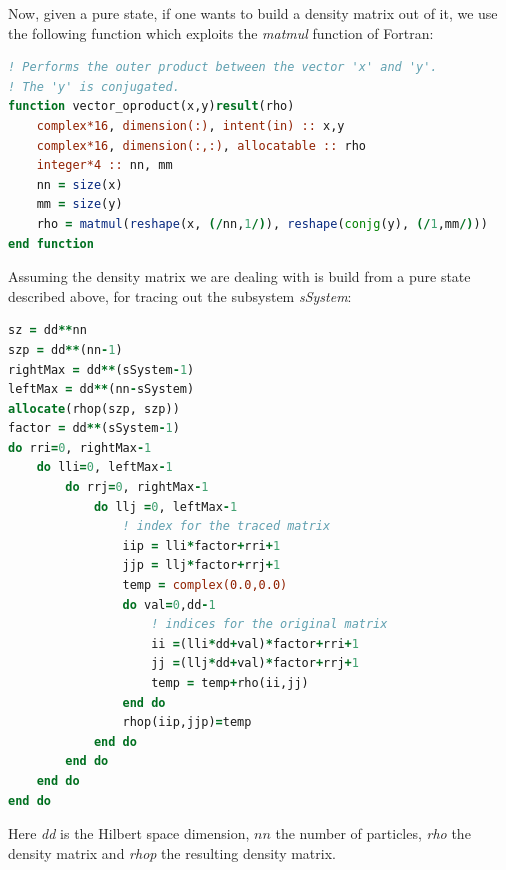 \documentclass{article}
\begin{document}
Now, given a pure state, if one wants to build a density matrix out of it, we use the following function which exploits the \textit{matmul} function of Fortran:
\begin{small}
\begin{lstlisting}[language=Fortran]
! Performs the outer product between the vector 'x' and 'y'.
! The 'y' is conjugated.
function vector_oproduct(x,y)result(rho)
	complex*16, dimension(:), intent(in) :: x,y
	complex*16, dimension(:,:), allocatable :: rho
	integer*4 :: nn, mm
	nn = size(x)
	mm = size(y)
	rho = matmul(reshape(x, (/nn,1/)), reshape(conjg(y), (/1,mm/)))
end function
\end{lstlisting}
\end{small}
Assuming the density matrix we are dealing with is build from a pure state described above, for tracing out the subsystem \textit{sSystem}:
\begin{small}
\begin{lstlisting}[language=Fortran]
sz = dd**nn
szp = dd**(nn-1)
rightMax = dd**(sSystem-1)
leftMax = dd**(nn-sSystem)
allocate(rhop(szp, szp))
factor = dd**(sSystem-1)
do rri=0, rightMax-1
	do lli=0, leftMax-1
		do rrj=0, rightMax-1
			do llj =0, leftMax-1
				! index for the traced matrix
				iip = lli*factor+rri+1
				jjp = llj*factor+rrj+1
				temp = complex(0.0,0.0)
				do val=0,dd-1
					! indices for the original matrix
					ii =(lli*dd+val)*factor+rri+1
					jj =(llj*dd+val)*factor+rrj+1
					temp = temp+rho(ii,jj)
				end do
				rhop(iip,jjp)=temp
			end do
		end do
	end do
end do
\end{lstlisting}
\end{small}
Here \textit{dd} is the Hilbert space dimension, $\textit{nn}$ the number of particles, \textit{rho} the density matrix and \textit{rhop} the resulting density matrix. 
\end{document}
